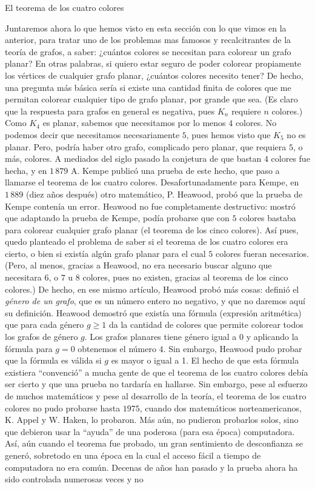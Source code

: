 \begin{section}{El teorema de los cuatro colores} \label{Ap4.3}

Juntaremos ahora lo que hemos visto en esta sección con lo que vimos en la anterior, para tratar uno de los problemas mas famosos y recalcitrantes de la teoría de grafos, a saber: ¿cuántos colores se necesitan para colorear un grafo planar? En otras palabras, si quiero estar seguro de poder colorear propiamente los vértices de cualquier grafo planar, ¿cuántos colores necesito tener? De hecho, una pregunta más básica sería si existe una cantidad finita de colores que me permitan colorear cualquier tipo de grafo planar, por grande que sea. (Es claro que la respuesta para grafos en general es negativa, pues $K_n$ requiere $n$ colores.) Como $K_4$ es planar, sabemos que necesitamos por lo menos $4$ colores. No podemos decir que necesitamos necesariamente $5$, pues hemos visto que $K_5$ no es planar. Pero, podría haber otro grafo, complicado pero planar, que requiera $5$, o más, colores. A mediados del siglo pasado la conjetura de que bastan $4$ colores fue hecha, y en $1\,879$ A. Kempe publicó una prueba de este hecho, que paso a llamarse el teorema de los cuatro colores. Desafortunadamente para Kempe, en $1\,889$ (diez años después) otro matemático, P. Heawood, probó que la prueba de Kempe contenía un error. Heawood no fue completamente destructivo: mostró que adaptando la prueba de Kempe, podía probarse que con $5$ colores bastaba para colorear cualquier grafo planar (el teorema de los cinco colores). Así pues, quedo planteado el problema de saber si el teorema de los cuatro colores era cierto, o bien si existía algún grafo planar para el cual $5$ colores fueran necesarios. (Pero, al menos, gracias a Heawood, no era necesario buscar alguno que necesitara $6$, o $7$ u $8$ colores, pues no existen, gracias al teorema de los cinco colores.) De hecho, en ese mismo artículo, Heawood probó más cosas: definió el \textit{género de un grafo}, que es un número entero no negativo, y que no daremos aquí su definición. Heawood demostró que existía una  fórmula (expresión aritmética) que para cada género $g\ge 1$ da la cantidad de colores que permite colorear todos los grafos de género $g$. Los grafos planares tiene género igual a $0$ y aplicando la fórmula para $g=0$ obtenemos el número $4$. Sin embargo, Heawood pudo probar que la fórmula es válida si $g$ es mayor o igual a 1. El hecho de que esta fórmula existiera ``convenció'' a mucha gente de que el teorema de los cuatro colores debía ser cierto y que una prueba no tardaría en hallarse. Sin embargo, pese al esfuerzo de muchos matemáticos y pese al desarrollo de la teoría, el teorema de los cuatro colores no pudo probarse hasta $1975$, cuando dos matemáticos  norteamericanos, K. Appel y W. Haken, lo probaron. Más aún, no pudieron probarlos solos, sino que debieron usar la ``ayuda'' de una poderosa (para esa época) computadora. Así, aún cuando el teorema fue probado, un gran sentimiento de desconfianza se generó, sobretodo en una época en la cual el acceso fácil a tiempo de computadora no era común. Decenas de años han pasado y la prueba ahora ha sido controlada numerosas veces y no 
\end{section}
